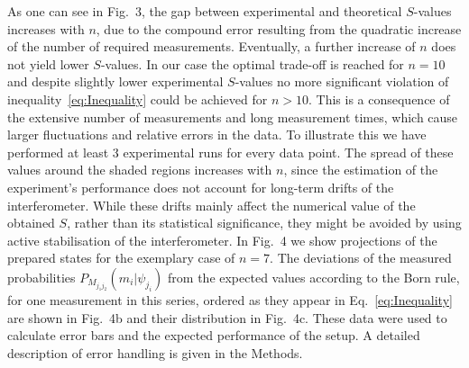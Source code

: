 \documentclass[aps,prl,floatfix,onecolumn,tightenlines,amsmath,amssymb,nofootinbib,12pt]{revtex4-2}
\begin{document}
As one can see in Fig.~3, the gap between experimental and theoretical $S$-values increases with $n$, due to the compound error resulting from the quadratic increase of the number of required measurements. Eventually, a further increase of $n$ does not yield lower $S$-values. In our case the optimal trade-off is reached for $n{=}10$ and despite slightly lower experimental $S$-values no more significant violation of inequality~\eqref{eq:Inequality} could be achieved for $n>10$. This is a consequence of the extensive number of measurements and long measurement times, which cause larger fluctuations and relative errors in the data. To illustrate this we have performed at least 3 experimental runs for every data point. The spread of these values around the shaded regions increases with $n$, since the estimation of the experiment's performance does not account for long-term drifts of the interferometer. While these drifts mainly affect the numerical value of the obtained $S$, rather than its statistical significance, they might be avoided by using active stabilisation of the interferometer.
In Fig.~4 we show projections of the prepared states for the exemplary case of $n{=}7$. The deviations of the measured probabilities $P_{M_{j_1j_2}}(m_i | \psi_{j_i})$ from the expected values according to the Born rule, for one measurement in this series, ordered as they appear in Eq.~\eqref{eq:Inequality} are shown in Fig.~4b and their distribution in Fig.~4c. These data were used to calculate error bars and the expected performance of the setup. A detailed description of error handling is given in the Methods.
\end{document}
